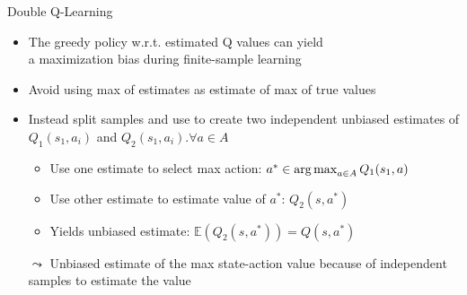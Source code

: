 \documentclass[aspectratio=169]{../latex_main/tntbeamer}  %
\begin{document}
\begin{frame}[c]{Double Q-Learning}	
	
	\begin{itemize}
		\item The greedy policy w.r.t. estimated Q values can yield\\ a maximization bias during finite-sample learning
		\item Avoid using max of estimates as estimate of max of true values
		\item Instead split samples and use to create two independent unbiased
		estimates of\\ $Q_1(s_1, a_i)$ and $Q_2(s_1, a_i). \forall a\in A$
		\begin{itemize}
			\item Use one estimate to select max action: $a^* \in \operatorname*{arg\,max}_{a \in A} Q_1(s_1, a)$
			\item Use other estimate to estimate value of $a^*$: $Q_2(s,a^*)$
			\item Yields unbiased estimate: $\mathbb{E}(Q_2(s,a^*)) = Q(s,a^*)$
		\end{itemize}
		\item[$\leadsto$] Unbiased estimate of the max state-action value because of independent samples to estimate the value
	\end{itemize}

	
\end{frame}
\end{document}
